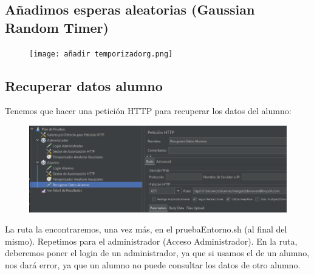 \documentclass[a4paper]{article}
\begin{document}
\subsection{Añadimos esperas aleatorias (Gaussian Random Timer)}
\begin{figure}[hbt!]
    \centering
    \texttt{[image: añadir temporizadorg.png]}
\end{figure}
\subsection{Recuperar datos alumno}
Tenemos que hacer una petición HTTP para recuperar los datos del alumno:
\begin{figure}[hbt!]
    \centering
    \includegraphics[width=\textwidth]{recuperar datos alumno.png}
\end{figure}
\newline La ruta la encontraremos, una vez más, en el pruebaEntorno.sh (al final del mismo).
Repetimos para el administrador (Acceso Administrador). En la ruta, deberemos poner 
el login de un administrador, ya que si usamos el de un alumno, nos dará error, ya que 
un alumno no puede consultar los datos de otro alumno.
\end{document}
